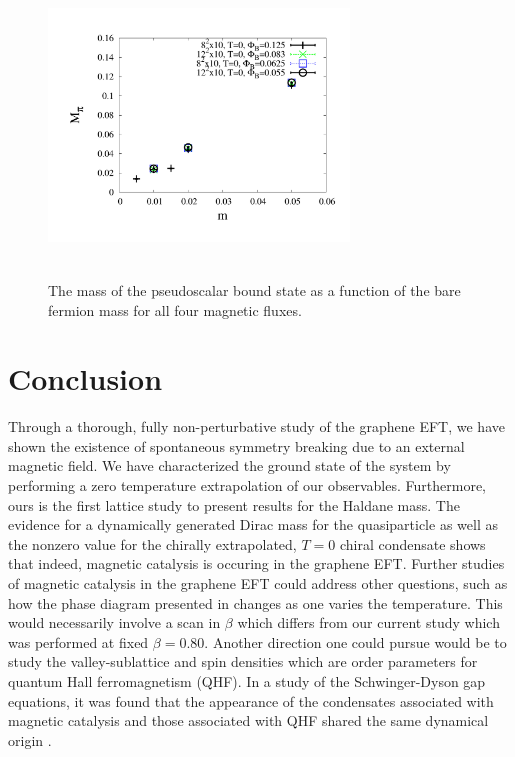 \documentclass[aps,prd,twocolumn,showpacs,superscriptaddress,groupedaddress]{revtex4}  %
\begin{document}
\begin{figure}
  \includegraphics[height=8cm,width=8cm]{ps_mt_vs_m_2exp_graphene_paper.pdf} \hspace{-1cm}
\caption{The mass of the pseudoscalar bound state as a function of the bare fermion mass for all four magnetic fluxes.}
\label{MPSvsm}
\end{figure}

\section{\label{sec:Conclusion}Conclusion}

Through a thorough, fully non-perturbative study of the graphene EFT, we have shown the existence of spontaneous symmetry breaking due to an external magnetic field.
We have characterized the ground state of the system by performing a zero temperature extrapolation of our observables. Furthermore, ours is the first lattice study to present results 
for the Haldane mass. The evidence for a dynamically generated Dirac mass for the quasiparticle as well as the nonzero value for the chirally extrapolated, $T=0$ chiral condensate shows
that indeed, magnetic catalysis is occuring in the graphene EFT. Further studies of magnetic catalysis in the graphene EFT could address other questions, such as how the phase diagram presented in \cite{Polikarpov} changes as one varies the temperature.
This would necessarily involve a scan in $\beta$ which differs from our current study which was performed at fixed $\beta=0.80$. Another direction one could pursue would be to 
study the valley-sublattice and spin densities which are order parameters for quantum Hall ferromagnetism (QHF). In a study of the Schwinger-Dyson gap equations, it was found that 
the appearance of the condensates associated with magnetic catalysis and those associated with QHF shared the same dynamical origin \cite{MiranskyGraphene2}.
\end{document}

